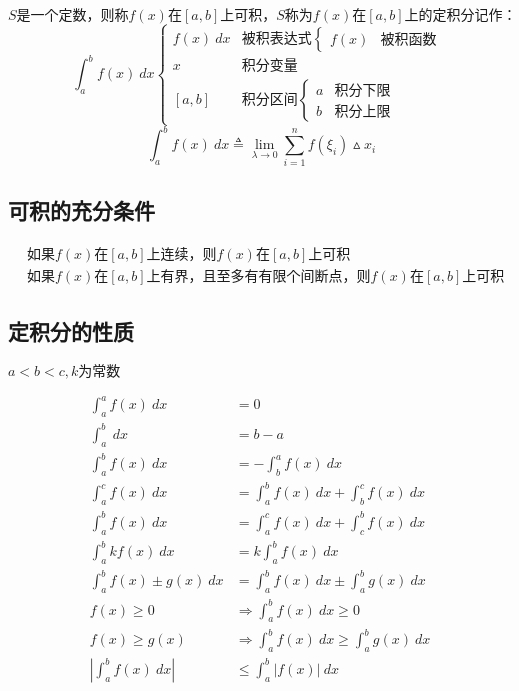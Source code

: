 $$S\mbox{是一个定数，则称}f(x)\mbox{在}\left[a,b\right]\mbox{上可积，}S\mbox{称为}f(x)\mbox{在}\left[a,b\right]\mbox{上的定积分记作：}$$
$$\int_{a}^{b}f(x)\ dx\begin{cases}
	f(x) \ dx &\mbox{被积表达式}\begin{cases}
		f(x) &\mbox{被积函数}
	\end{cases}\\
	x &\mbox{积分变量}\\
	\left[a,b\right]&\mbox{积分区间}\begin{cases}
			a &\mbox{积分下限}\\  
		b &\mbox{积分上限}
	\end{cases}
\end{cases}$$
$$\ \int_{a}^{b}f(x) \ dx\triangleq\lim\limits_{\lambda \to 0}\sum_{i=1}^{n}f(\xi_i)\vartriangle x_i$$
\subsection{可积的充分条件}
\begin{align}
		&\mbox{如果}f(x)\mbox{在}\left[a,b\right]\mbox{上连续，则}f(x)\mbox{在}\left[a,b\right]\mbox{上可积}\\
		&\mbox{如果}f(x)\mbox{在}\left[a,b\right]\mbox{上有界，且至多有有限个间断点，则}f(x)\mbox{在}\left[a,b\right]\mbox{上可积}
\end{align}

\subsection{定积分的性质}
\centerline{$a<b<c,k\mbox{为常数}$}
\vspace{-5mm}
\begin{align}	
	\int_{a}^{a}f(x)\ dx&=0 \label{Definite_integral_property_1}\\
	\int_{a}^{b}\ dx &=b-a \label{Definite_integral_property_2}\\
	\int_{a}^{b}f(x)\ dx&=-\int_{b}^{a}f(x)\ dx \label{Definite_integral_property_3}\\
	\int_{a}^{c}f(x)\ dx&=\int_{a}^{b} f(x)\ dx+\int_{b}^{c}f(x)\ dx \label{Definite_integral_property_4}\\
	\int_{a}^{b}f(x)\ dx&=\int_{a}^{c}f(x)\ dx+\int_{c}^{b}f(x)\ dx \label{Definite_integral_property_5}\\
	\int_{a}^{b}kf(x)\ dx&=k\int_{a}^{b}f(x)\ dx \label{Definite_integral_property_6}\\
	\int_{a}^{b}f(x)\pm g(x)\ dx&=\int_{a}^{b}f(x)\ dx\pm \int_{a}^{b}g(x)\ dx\label{Definite_integral_property_7} \\
	f(x)\geqslant 0\quad &\Rightarrow \int_{a}^{b}f(x)\ dx\geqslant 0 \label{Definite_integral_property_8}\\
	f(x)\geqslant g(x)\quad &\Rightarrow \int_{a}^{b}f(x)\ dx\geqslant \int_{a}^{b}g(x)\ dx \label{Definite_integral_property_9}\\
	\left|\int_{a}^{b}f(x) \ dx\right|&\leqslant \int_{a}^{b}\left|f(x)\right|\ dx \label{Definite_integral_property_10}
\end{align}
